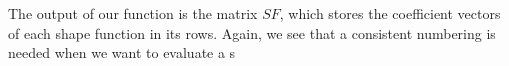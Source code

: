 \documentclass[a4paper,12pt]{article}
\begin{document}
The output of our function is the matrix $SF$, which stores the coefficient vectors of each shape function in its rows. Again, we see that a consistent numbering is needed when we want to evaluate a s
\end{document}
